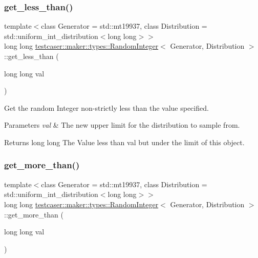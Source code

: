 \subsubsection{\texorpdfstring{get\_less\_than()}{get\_less\_than()}}
{\footnotesize\ttfamily template$<$class Generator = std\+::mt19937, class Distribution = std\+::uniform\+\_\+int\+\_\+distribution$<$long long$>$$>$ \\
long long \mbox{\hyperlink{classtestcaser_1_1maker_1_1types_1_1RandomInteger}{testcaser\+::maker\+::types\+::\+Random\+Integer}}$<$ Generator, Distribution $>$\+::get\+\_\+less\+\_\+than (\begin{DoxyParamCaption}\item[{long long}]{val }\end{DoxyParamCaption})\hspace{0.3cm}{\ttfamily [inline]}}



Get the random Integer non-\/strictly less than the value specified. 


\begin{DoxyParams}{Parameters}
{\em val} & The new upper limit for the distribution to sample from. \\
\hline
\end{DoxyParams}
\begin{DoxyReturn}{Returns}
long long The Value less than val but under the limit of this object. 
\end{DoxyReturn}
\mbox{\label{classtestcaser_1_1maker_1_1types_1_1RandomInteger_ace51a32acc0f219b70aa00d1cd2604c5}} 
\subsubsection{\texorpdfstring{get\_more\_than()}{get\_more\_than()}}
{\footnotesize\ttfamily template$<$class Generator = std\+::mt19937, class Distribution = std\+::uniform\+\_\+int\+\_\+distribution$<$long long$>$$>$ \\
long long \mbox{\hyperlink{classtestcaser_1_1maker_1_1types_1_1RandomInteger}{testcaser\+::maker\+::types\+::\+Random\+Integer}}$<$ Generator, Distribution $>$\+::get\+\_\+more\+\_\+than (\begin{DoxyParamCaption}\item[{long long}]{val }\end{DoxyParamCaption})\hspace{0.3cm}{\ttfamily [inline]}}



